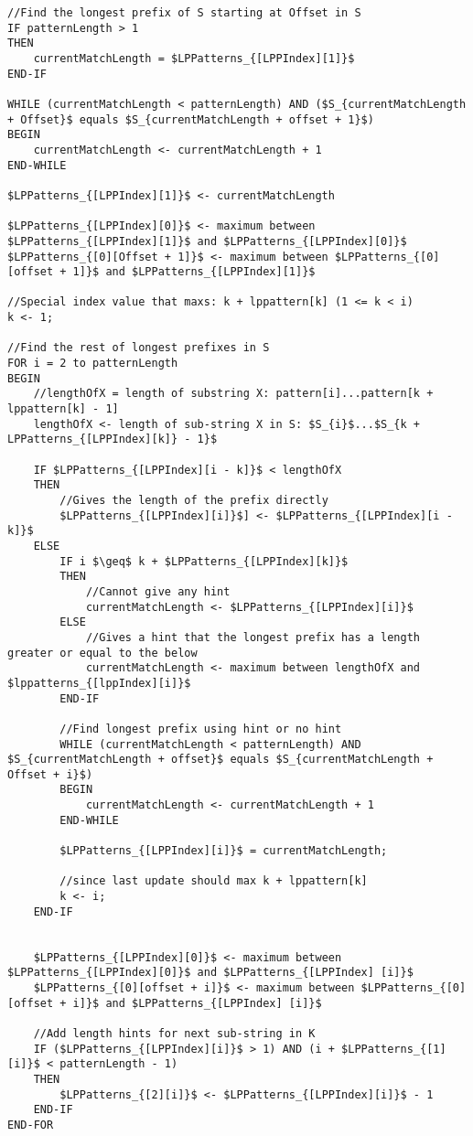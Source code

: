 \documentclass[12pt]{article}
\begin{document}
\begin{flushleft}
\begin{lstlisting}
//Find the longest prefix of S starting at Offset in S
IF patternLength > 1 
THEN
	currentMatchLength = $LPPatterns_{[LPPIndex][1]}$
END-IF

WHILE (currentMatchLength < patternLength) AND ($S_{currentMatchLength + Offset}$ equals $S_{currentMatchLength + offset + 1}$)
BEGIN
	currentMatchLength <- currentMatchLength + 1
END-WHILE

$LPPatterns_{[LPPIndex][1]}$ <- currentMatchLength

$LPPatterns_{[LPPIndex][0]}$ <- maximum between $LPPatterns_{[LPPIndex][1]}$ and $LPPatterns_{[LPPIndex][0]}$
$LPPatterns_{[0][Offset + 1]}$ <- maximum between $LPPatterns_{[0][offset + 1]}$ and $LPPatterns_{[LPPIndex][1]}$

//Special index value that maxs: k + lppattern[k] (1 <= k < i)
k <- 1;

//Find the rest of longest prefixes in S
FOR i = 2 to patternLength
BEGIN
	//lengthOfX = length of substring X: pattern[i]...pattern[k + lppattern[k] - 1]
	lengthOfX <- length of sub-string X in S: $S_{i}$...$S_{k + LPPatterns_{[LPPIndex][k]} - 1}$
	
	IF $LPPatterns_{[LPPIndex][i - k]}$ < lengthOfX
	THEN
		//Gives the length of the prefix directly
		$LPPatterns_{[LPPIndex][i]}$] <- $LPPatterns_{[LPPIndex][i - k]}$
	ELSE	
		IF i $\geq$ k + $LPPatterns_{[LPPIndex][k]}$
		THEN
			//Cannot give any hint
			currentMatchLength <- $LPPatterns_{[LPPIndex][i]}$
		ELSE
			//Gives a hint that the longest prefix has a length greater or equal to the below
			currentMatchLength <- maximum between lengthOfX and $lppatterns_{[lppIndex][i]}$
		END-IF
		
		//Find longest prefix using hint or no hint
		WHILE (currentMatchLength < patternLength) AND $S_{currentMatchLength + offset}$ equals $S_{currentMatchLength + Offset + i}$)
		BEGIN
			currentMatchLength <- currentMatchLength + 1
		END-WHILE
		
		$LPPatterns_{[LPPIndex][i]}$ = currentMatchLength;
		
		//since last update should max k + lppattern[k]
		k <- i;
	END-IF
	

	$LPPatterns_{[LPPIndex][0]}$ <- maximum between $LPPatterns_{[LPPIndex][0]}$ and $LPPatterns_{[LPPIndex] [i]}$
	$LPPatterns_{[0][offset + i]}$ <- maximum between $LPPatterns_{[0][offset + i]}$ and $LPPatterns_{[LPPIndex] [i]}$
	
	//Add length hints for next sub-string in K
	IF ($LPPatterns_{[LPPIndex][i]}$ > 1) AND (i + $LPPatterns_{[1][i]}$ < patternLength - 1)
	THEN
		$LPPatterns_{[2][i]}$ <- $LPPatterns_{[LPPIndex][i]}$ - 1
	END-IF
END-FOR


\end{lstlisting}
\end{flushleft}
\end{document}
